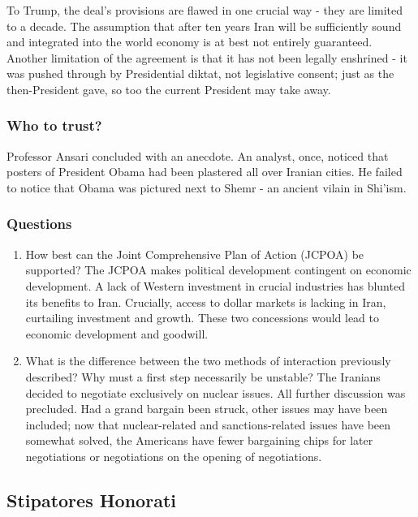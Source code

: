 To Trump, the deal's provisions are flawed in one crucial way - they are
limited to a decade. The assumption that after ten years Iran will be
sufficiently sound and integrated into the world economy is at best not
entirely guaranteed. Another limitation of the agreement is that it has
not been legally enshrined - it was pushed through by Presidential
diktat, not legislative consent; just as the then-President gave, so too
the current President may take away.

\subsubsection{Who to trust?}\label{who-to-trust}

Professor Ansari concluded with an anecdote. An analyst, once, noticed
that posters of President Obama had been plastered all over Iranian
cities. He failed to notice that Obama was pictured next to Shemr - an
ancient vilain in Shi'ism.

\subsubsection{Questions}\label{questions}

\begin{enumerate}
\def\labelenumi{\arabic{enumi}.}
\item
  How best can the Joint Comprehensive Plan of Action (JCPOA) be
  supported? The JCPOA makes political development contingent on
  economic development. A lack of Western investment in crucial
  industries has blunted its benefits to Iran. Crucially, access to
  dollar markets is lacking in Iran, curtailing investment and growth.
  These two concessions would lead to economic development and goodwill.
\item
  What is the difference between the two methods of interaction
  previously described? Why must a first step necessarily be unstable?
  The Iranians decided to negotiate exclusively on nuclear issues. All
  further discussion was precluded. Had a grand bargain been struck,
  other issues may have been included; now that nuclear-related and
  sanctions-related issues have been somewhat solved, the Americans have
  fewer bargaining chips for later negotiations or negotiations on the
  opening of negotiations.
\end{enumerate}

\subsection{Stipatores Honorati}\label{stipatores-honorati}


